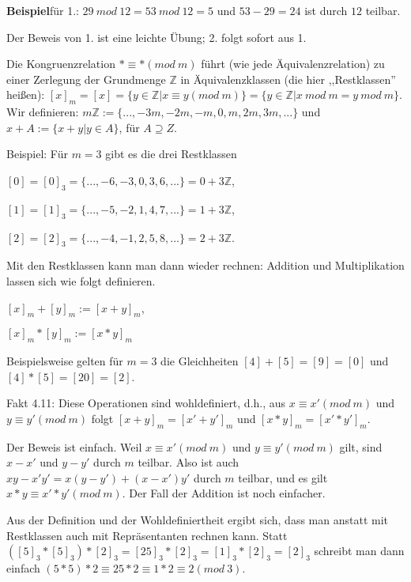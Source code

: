 \documentclass[a4paper]{article}
\begin{document}
\begin{multicols}{3}
    \textbf{Beispiel}für 1.: $29\ mod\ 12 = 53\ mod\ 12 = 5$ und $53-29 = 24$ ist durch $12$ teilbar.

    Der Beweis von 1. ist eine leichte Übung; 2. folgt sofort aus 1.

    Die Kongruenzrelation $* \equiv *(mod\ m)$ führt (wie jede Äquivalenzrelation) zu einer Zerlegung der Grundmenge $\mathbb{Z}$ in Äquivalenzklassen (die hier ,,Restklassen'' heißen): $[x]_m= [x] =\{y\in\mathbb{Z}|x\equiv y(mod\ m)\}=\{y\in\mathbb{Z}|x\ mod\ m=y\ mod\ m\}$. Wir definieren: $m\mathbb{Z}:=\{...,-3m,-2m,-m,0,m,2m,3m,...\}$ und $x+A:=\{x+y|y\in A\}$, für $A\supseteq Z$.

    Beispiel: Für $m=3$ gibt es die drei Restklassen
    \begin{itemize*}
        \item $[0] = [0]_3 =\{...,-6,-3,0,3,6,...\}= 0 + 3\mathbb{Z}$,
        \item $[1] = [1]_3 =\{...,-5,-2,1,4,7,...\}= 1 + 3\mathbb{Z}$,
        \item $[2] = [2]_3 =\{...,-4,-1,2,5,8,...\}= 2 + 3\mathbb{Z}$.
    \end{itemize*}

    Mit den Restklassen kann man dann wieder rechnen: Addition und Multiplikation lassen sich wie folgt definieren.
    \begin{itemize*}
        \item $[x]_m+ [y]_m := [x+y]_m$,
        \item $[x]_m*[y]_m := [x*y]_m$
    \end{itemize*}

    Beispielsweise gelten für $m=3$ die Gleichheiten $[4] + [5] = [9] = [0]$ und $[4]*[5] =[20] = [2]$.

    Fakt 4.11: Diese Operationen sind wohldefiniert, d.h., aus $x\equiv x'(mod\ m)$ und $y\equiv y'(mod\ m)$ folgt $[x+y]_m= [x'+y']_m$ und $[x*y]_m= [x'*y']_m$.

    Der Beweis ist einfach. Weil $x\equiv x' (mod\ m)$ und $y\equiv y' (mod\ m)$ gilt, sind $x-x'$ und $y-y'$ durch $m$ teilbar. Also ist auch $xy-x'y'=x(y-y') + (x-x')y'$ durch $m$ teilbar, und es gilt $x*y\equiv x'*y' (mod\ m)$. Der Fall der Addition ist noch einfacher.

    Aus der Definition und der Wohldefiniertheit ergibt sich, dass man anstatt mit Restklassen auch mit Repräsentanten rechnen kann. Statt $([5]_3 *[5]_3)*[2]_3 = [25]_3 *[2]_3 = [1]_3 *[2]_3 = [2]_3$ schreibt man dann einfach $(5*5)* 2 \equiv 25 * 2 \equiv 1 * 2 \equiv 2 (mod\ 3)$.


\end{multicols}
\end{document}
